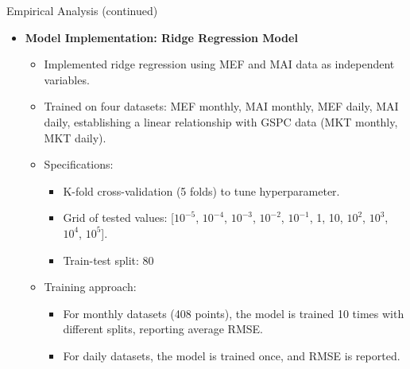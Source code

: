 \documentclass{beamer}
\begin{document}
\begin{frame}{Empirical Analysis (continued)}
  \begin{itemize}
    \item \textbf{Model Implementation: Ridge Regression Model}
      \begin{itemize}
        \item Implemented ridge regression using MEF and MAI data as independent variables.
        \item Trained on four datasets: MEF monthly, MAI monthly, MEF daily, MAI daily, establishing a linear relationship with GSPC data (MKT monthly, MKT daily).
        \item Specifications:
          \begin{itemize}
            \item K-fold cross-validation (5 folds) to tune hyperparameter.
            \item Grid of tested values: [\(10^{-5}\), \(10^{-4}\), \(10^{-3}\), \(10^{-2}\), \(10^{-1}\), 1, 10, \(10^2\), \(10^3\), \(10^4\), \(10^5\)].
            \item Train-test split: 80%
          \end{itemize}
        \item Training approach:
          \begin{itemize}
            \item For monthly datasets (408 points), the model is trained 10 times with different splits, reporting average RMSE.
            \item For daily datasets, the model is trained once, and RMSE is reported.
          \end{itemize}
      \end{itemize}
  \end{itemize}
\end{frame}
\end{document}
